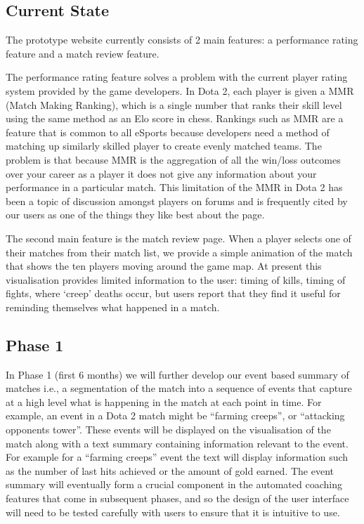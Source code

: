 \documentclass[12pt]{article} %
\begin{document}
\subsection{Current State}

The prototype website currently consists of 2 main features: a performance rating feature and a match review feature.

The performance rating feature solves a problem with the current player rating system provided by the game developers. In Dota 2, each player is given a MMR (Match Making Ranking), which is a single number that ranks their skill level using the same method as an Elo score in chess. Rankings such as MMR are a feature that is common to all eSports because developers need a method of matching up similarly skilled player to create evenly matched teams. The problem is that because MMR is the aggregation of all the win/loss outcomes over your career as a player it does not give any information about your performance in a particular match. This limitation of the MMR in Dota 2 has been a topic of discussion amongst players on forums and is frequently cited by our users as one of the things they like best about the page.

The second main feature is the match review page. When a player selects one of their matches from their match list, we provide a simple animation of the match that shows the ten players moving around the game map. At present this visualisation provides limited information to the user: timing of kills, timing of fights, where `creep' deaths occur, but users report that they find it useful for reminding themselves what happened in a match.

\subsection{Phase 1} 

In Phase 1 (first 6 months) we will further develop our event based summary of matches i.e., a segmentation of the match into a sequence of events that capture at a high level what is happening in the match at each point in time. For example, an event in a Dota 2 match might be ``farming creeps'', or ``attacking opponents tower''. These events will be displayed on the visualisation of the match along with a text summary containing information relevant to the event. For example for a ``farming creeps'' event the text will display information such as the number of last hits achieved or the amount of gold earned. The event summary will eventually form a crucial component in the automated coaching features that come in subsequent phases, and so the design of the user interface will need to be tested carefully with users to ensure that it is intuitive to use.
\end{document}

